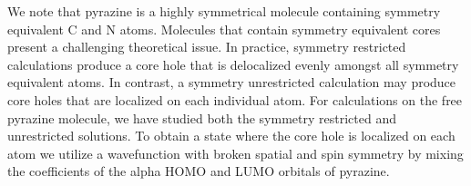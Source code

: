 \documentclass{article}
\begin{document}
\begin{comment}
\begin{table*}
\caption{First two acetylene core excitations calculated on growing sizes of silicon clusters. All structures were optimized at the B3LYP/6-31G* level of theory, core excitations were calculated at the B3LYP levelusing the cc-pVTZ basis set for C and H atoms and 6-31G basis set for Si atoms. We have reported the most dominant atomic transition and its respective total transition dipole contribution.}
\begin{tabular}{ccccc}
\hline
\hline
Cluster & Transition& Energy (eV) & $f^{\rm abs}_{\rm osc}$ & $|\mathrm{A}_{l_\mathrm{A}} \rightarrow \mathrm{B}_{l_\mathrm{B}} |_{\rm max}$ \\
\hline
\vspace{0.2cm}\\
\multirow{2}{*}{\raisebox{-0.7cm}[0.5cm][0.5cm]{\texttt{[image: si9\_ace.pdf]}}} & $\pi^*_{\rm C-C}$ & 284.31 & 0.0204 & C$_{\rm s}$ $\rightarrow$ C$_{\rm p}$\\
 & $\sigma^*_{\rm C-Si}$ & 285.80 & 0.0065 & C$_{\rm s}$ $\rightarrow$ Si$_{\rm p}$\\
\vspace{0.2cm}\\
\multirow{2}{*}{\raisebox{-0.6cm}[0.5cm][0.5cm]{\texttt{[image: si15\_ace.pdf]}}} & $\pi^*_{\rm C-C}$ & 284.35 & 0.0199 & C$_{\rm s}$ $\rightarrow$ C$_{\rm p}$ \\
 & $\sigma^*_{\rm C-Si}$ & 285.72 & 0.0063 & C$_{\rm s}$ $\rightarrow$ Si$_{\rm p}$ \\
 \vspace{0.2 cm}\\
\multirow{2}{*}{\raisebox{-0.6cm}[0.5cm][0.5cm]{\texttt{[image: si21\_ace.pdf]}}}& $\pi^*_{\rm C-C}$ & 284.25 & 0.0196 & C$_{\rm s}$ $\rightarrow$ C$_{\rm p}$ \\
 & $\sigma^*_{\rm C-Si}$ & 285.71 & 0.0038 & C$_{\rm s}$ $\rightarrow$ Si$_{\rm p}$ \\
 \hline
 \hline
\end{tabular}
\label{tab:Cluster_Extend}
\end{table*}
\end{comment}
We note that pyrazine is a highly symmetrical molecule containing symmetry equivalent C and N atoms. Molecules that contain symmetry equivalent cores present a challenging theoretical issue.\cite{ma_breaking_1989,carravetta_symmetry_2013} In practice, symmetry restricted calculations produce a core hole that is delocalized evenly amongst all symmetry equivalent atoms. In contrast, a symmetry unrestricted calculation may produce core holes that are localized on each individual atom. For calculations on the free pyrazine molecule, we have studied both the symmetry restricted and unrestricted solutions. To obtain a state where the core hole is localized on each atom we utilize a wavefunction with broken spatial and spin symmetry by mixing the coefficients of the alpha HOMO and LUMO orbitals of pyrazine. 
\end{document}
